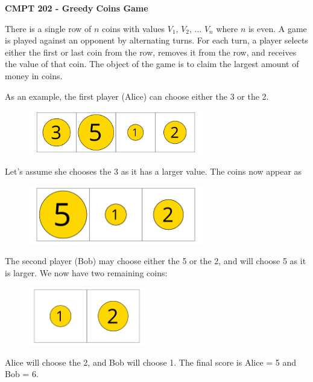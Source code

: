 \documentclass[11pt]{article}
\begin{document}
{\large {\bf CMPT 202 - Greedy Coins Game}} 

There is a single row of $n$ coins with values $V_1$, $V_2$, ... $V_n$ where $n$ is even. A game is played against an opponent by alternating turns. For each turn, a player selects either the first or last coin from the row, removes it from the row, and receives the value of that coin. The object of the game is to claim the largest amount of money in coins.

As an example, the first player (Alice) can choose either the 3 or the 2. 

\begin{figure}[h]
\centerline {
\includegraphics[width=3in]{img-1.png}
}

\end{figure}

Let's assume she chooses the 3 as it has a larger value. The coins now appear as

\begin{figure}[h]
\centerline {
\includegraphics[width=3in]{img-2.png}
}

\end{figure}

The second player (Bob) may choose either the 5 or the 2, and will choose 5 as it is larger. We now have two remaining coins:

\begin{figure}[h]
\centerline {
\includegraphics[width=2in]{img-3.png}
}

\end{figure}

Alice will choose the 2, and Bob will choose 1. The final score is Alice = 5 and Bob = 6.
\end{document}
